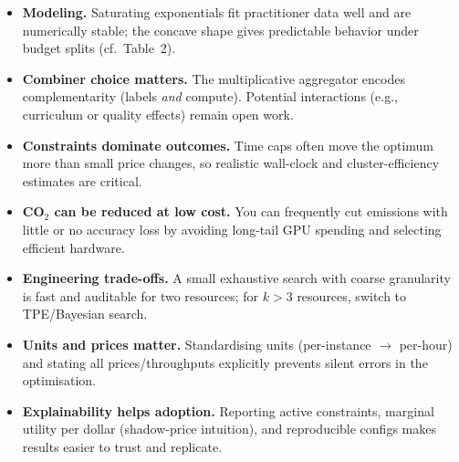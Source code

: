 \documentclass[11pt]{article}
\begin{document}
\begin{itemize}
  \item \textbf{Modeling.} Saturating exponentials fit practitioner data well and are numerically stable; the concave shape gives predictable behavior under budget splits (cf.\ Table~2).
  \item \textbf{Combiner choice matters.} The multiplicative aggregator encodes complementarity (labels \emph{and} compute). Potential interactions (e.g., curriculum or quality effects) remain open work.
  \item \textbf{Constraints dominate outcomes.} Time caps often move the optimum more than small price changes, so realistic wall-clock and cluster-efficiency estimates are critical.
  \item \textbf{CO$_2$ can be reduced at low cost.} You can frequently cut emissions with little or no accuracy loss by avoiding long-tail GPU spending and selecting efficient hardware.
  \item \textbf{Engineering trade-offs.} A small exhaustive search with coarse granularity is fast and auditable for two resources; for $k\!>\!3$ resources, switch to TPE/Bayesian search.
  \item \textbf{Units and prices matter.} Standardising units (per-instance $\rightarrow$ per-hour) and stating all prices/throughputs explicitly prevents silent errors in the optimisation.
  \item \textbf{Explainability helps adoption.} Reporting active constraints, marginal utility per dollar (shadow-price intuition), and reproducible configs makes results easier to trust and replicate.
\end{itemize}


\clearpage


\end{document}
